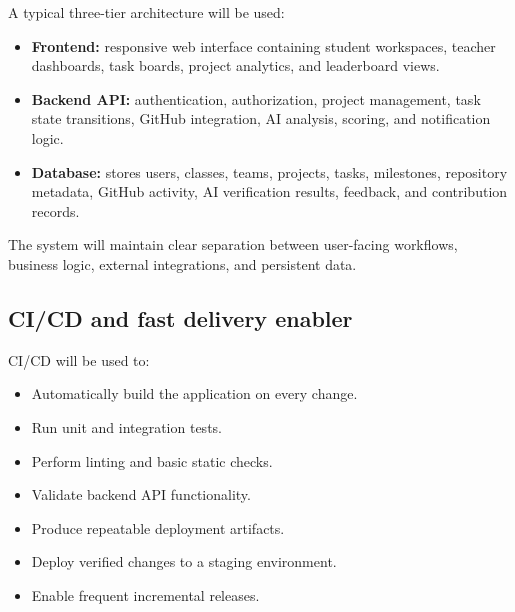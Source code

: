 \documentclass[11pt,a4paper]{article}
\begin{document}
A typical three-tier architecture will be used:

\begin{itemize}[leftmargin=0.7cm]

    \item \textbf{Frontend:} responsive web interface containing student workspaces, teacher dashboards, task boards, project analytics, and leaderboard views.

    \item \textbf{Backend API:} authentication, authorization, project management, task state transitions, GitHub integration, AI analysis, scoring, and notification logic.

    \item \textbf{Database:} stores users, classes, teams, projects, tasks, milestones, repository metadata, GitHub activity, AI verification results, feedback, and contribution records.

\end{itemize}

The system will maintain clear separation between user-facing workflows, business logic, external integrations, and persistent data.


\subsection{CI/CD and fast delivery enabler}

CI/CD will be used to:

\begin{itemize}[leftmargin=0.7cm]

    \item Automatically build the application on every change.

    \item Run unit and integration tests.

    \item Perform linting and basic static checks.

    \item Validate backend API functionality.

    \item Produce repeatable deployment artifacts.

    \item Deploy verified changes to a staging environment.

    \item Enable frequent incremental releases.

\end{itemize}
\end{document}
